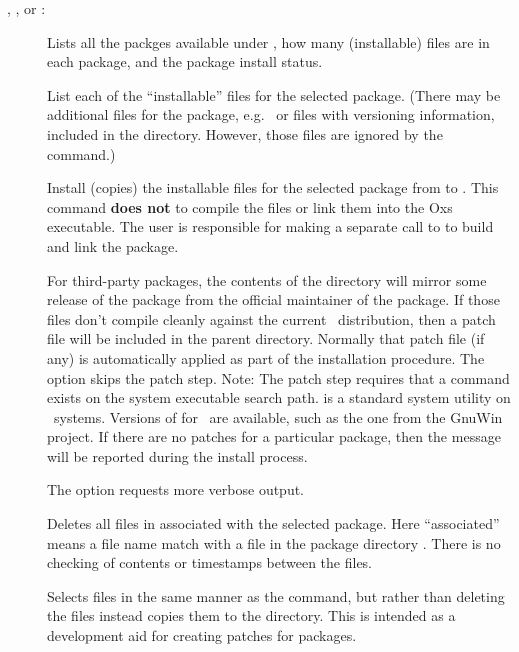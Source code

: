 , , or :
\begin{description}
\item[]
  Lists all the packges available under
  , how many (installable) files are in
  each package, and the package install status.
\item[]
  List each of the ``installable'' files for the selected package.
  (There may be additional files for the package, e.g.\  or
  files with versioning information, included in the
   directory.  However, those
  files are ignored by the  command.)
\item[]
  Install (copies) the installable files for the selected package
  from  to .
  This command \textbf{does not} to compile the files or link them
  into the Oxs executable.  The user is responsible for making a
  separate call to 
  to build and link the package.

  For third-party packages, the contents of the
   directory will mirror some
  release of the package from the official maintainer of the package.
  If those files don't compile cleanly against the current
  \OOMMF\ distribution, then a patch file will be included in the
  parent  directory.  Normally that patch
  file (if any) is automatically applied as part of the installation
  procedure.  The  option skips the patch step.  Note:
  The patch step requires that a  command exists on the
  system executable search path.   is a standard system
  utility on \Unix\ systems.  Versions of  for \Windows\ are
  available, such as the one from the GnuWin project.  If there are no
  patches for a particular package, then the message  will be reported during the install process.

  The  option requests more verbose output.
\item[]
 Deletes all files in  associated with the
 selected package.  Here ``associated'' means a file name match with a
 file in the package directory .
 There is no checking of contents or timestamps between the files.
\item[]
  Selects files in the same manner as the  command, but
  rather than deleting the files instead copies them to the
   directory.  This is intended as a development aid
  for creating patches for packages.
\end{description}

